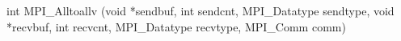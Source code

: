 int MPI_Alltoallv
  (void *sendbuf, int sendcnt, MPI_Datatype sendtype, 
   void *recvbuf, int recvcnt, MPI_Datatype recvtype,
   MPI_Comm comm)

